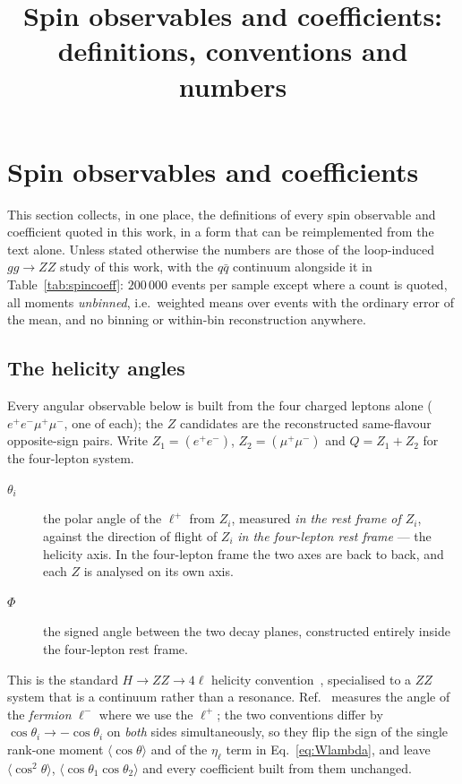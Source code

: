 \documentclass[a4paper,11pt]{article}
\title{Spin observables and coefficients: definitions, conventions and numbers}
\author{}
\date{}
\providecommand{\etal}{\ensuremath{\eta_\ell}}          %
\providecommand{\fourl}{four-lepton}
\begin{document}
\maketitle


\section{Spin observables and coefficients}
\label{sec:spinobs}

This section collects, in one place, the definitions of every spin observable
and coefficient quoted in this work, in a form that can be reimplemented from
the text alone. Unless stated otherwise the numbers are those of the
loop-induced $gg\to ZZ$ study of this work, with the
$q\bar q$ continuum alongside it in Table~\ref{tab:spincoeff}: $200\,000$
events per sample except where a count is quoted, all moments \emph{unbinned},
i.e.\ weighted means over events with the ordinary error of the mean, and no
binning or within-bin reconstruction anywhere.

\subsection{The helicity angles}
\label{subsec:spinobs_angles}

Every angular observable below is built from the four charged leptons alone
($e^+e^-\mu^+\mu^-$, one of each); the $Z$ candidates are the reconstructed
same-flavour opposite-sign pairs. Write $Z_1=(e^+e^-)$, $Z_2=(\mu^+\mu^-)$ and
$Q=Z_1+Z_2$ for the \fourl{} system.

\begin{description}
\item[$\theta_i$] the polar angle of the $\ell^+$ from $Z_i$, measured
  \emph{in the rest frame of $Z_i$}, against the direction of flight of $Z_i$
  \emph{in the \fourl{} rest frame} --- the helicity axis. In the \fourl{}
  frame the two axes are back to back, and each $Z$ is analysed on its own
  axis.
\item[$\Phi$] the signed angle between the two decay planes, constructed
  entirely inside the \fourl{} rest frame.
\end{description}

This is the standard $H\to ZZ\to4\ell$ helicity convention~\cite{Gao:2010qx},
specialised to a $ZZ$ system that is a continuum rather than a resonance.
Ref.~\cite{Gao:2010qx} measures the angle of the \emph{fermion} $\ell^-$ where
we use the $\ell^+$; the two conventions differ by $\cos\theta_i\to
-\cos\theta_i$ on \emph{both} sides simultaneously, so they flip the sign of
the single rank-one moment $\langle\cos\theta\rangle$ and of the $\etal$ term
in Eq.~\eqref{eq:Wlambda}, and leave $\langle\cos^2\theta\rangle$,
$\langle\cos\theta_1\cos\theta_2\rangle$ and every coefficient built from them
unchanged.
\end{document}
